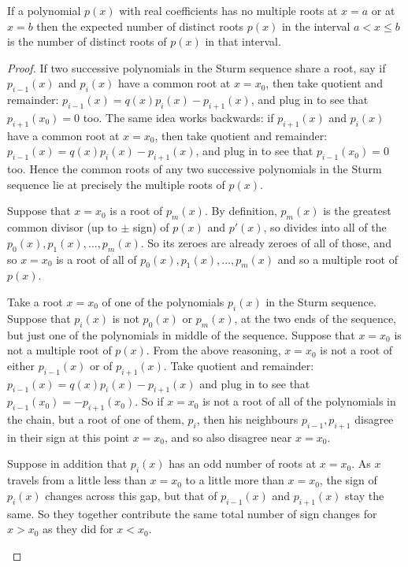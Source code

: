 \begin{theorem}[Sturm]
If a polynomial \(p(x)\) with real coefficients has no multiple roots at \(x=a\) or at \(x=b\) then the expected number of distinct roots \(p(x)\) in the interval \(a < x \le b\) is the number of distinct roots of \(p(x)\) in that interval.
\end{theorem}
\begin{proof}
If two successive polynomials in the Sturm sequence share a root, say if \(p_{i-1}(x)\) and \(p_i(x)\) have a common root at \(x=x_0\), then take quotient and remainder:
\(p_{i-1}(x) = q(x) p_i(x) - p_{i+1}(x)\), and plug in to see that \(p_{i+1}(x_0)=0\) too.
The same idea works backwards: if \(p_{i+1}(x)\) and \(p_i(x)\) have a common root at \(x=x_0\), then take quotient and remainder: \(p_{i-1}(x) = q(x) p_i(x) - p_{i+1}(x)\), and plug in to see that \(p_{i-1}(x_0)=0\) too.
Hence the common roots of any two successive polynomials in the Sturm sequence lie at precisely the multiple roots of \(p(x)\).

Suppose that \(x=x_0\) is a root of \(p_m(x)\).
By definition, \(p_m(x)\) is the greatest common divisor (up to \(\pm\) sign) of \(p(x)\) and \(p'(x)\), so divides into all of the \(p_0(x), p_1(x), \dots, p_m(x)\).
So its zeroes are already zeroes of all of those, and so \(x=x_0\) is a root of all of \(p_0(x), p_1(x), \dots, p_m(x)\) and so a multiple root of \(p(x)\).

Take a root \(x=x_0\) of one of the polynomials \(p_i(x)\) in the Sturm sequence.
Suppose that \(p_i(x)\) is not \(p_0(x)\) or \(p_m(x)\), at the two ends of the sequence, but just one of the polynomials in middle of the sequence.
Suppose that \(x=x_0\) is not a multiple root of \(p(x)\).
From the above reasoning, \(x=x_0\) is not a root of either \(p_{i-1}(x)\) or of \(p_{i+1}(x)\).
Take quotient and remainder: \(p_{i-1}(x) = q(x) p_i(x) - p_{i+1}(x)\) and plug in to see that 
\(p_{i-1}(x_0)=-p_{i+1}(x_0)\).
So if \(x=x_0\) is not a root of all of the polynomials in the chain, but a root of one of them, \(p_i\), then his neighbours \(p_{i-1}, p_{i+1}\) disagree in their sign at this point \(x=x_0\), and so also disagree near \(x=x_0\).
\begin{center}
\qquad
\qquad
\qquad

\end{center}

Suppose in addition that \(p_i(x)\) has an odd number of roots at \(x=x_0\).
As \(x\) travels from a little less than \(x=x_0\) to a little more than \(x=x_0\), the sign of \(p_i(x)\) changes across this gap, but that of \(p_{i-1}(x)\) and \(p_{i+1}(x)\) stay the same.
So they together contribute the same total number of sign changes for \(x>x_0\) as they did for \(x<x_0\).
\begin{center}
\qquad

\end{center}


\end{proof}
